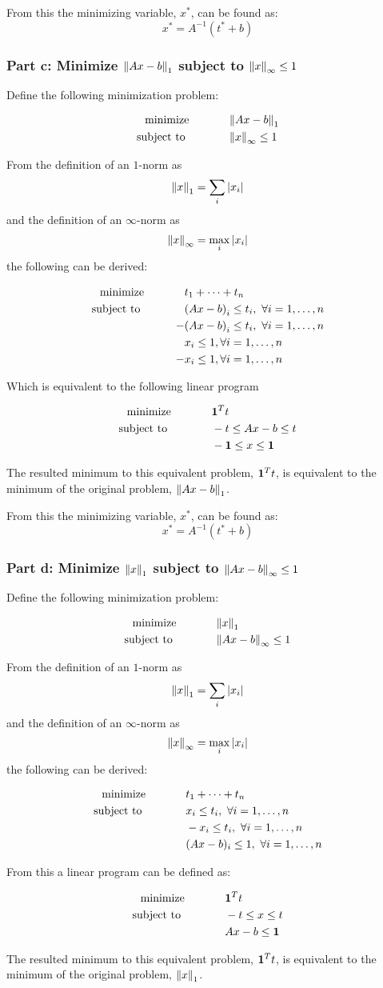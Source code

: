 \documentclass[letter]{article}
\newcommand{\optpblm}[3][eq:default]{
	\begin{equation}\label{#1}
		\begin{aligned}
			\text{minimize} \hspace{0.5in} &#2\vspace{5pt}\\
			\text{subject to \hspace{0.5in}} &#3
		\end{aligned}	
	\end{equation}
}
\begin{document}
From this the minimizing variable, $x^*$, can be found as: $$x^* = A^{-1} (t^* + b)$$

\newpage
\subsubsection{Part c: Minimize $\norm{Ax-b}_1$ subject to $\norm{x}_{\infty}\leq 1$}
Define the following minimization problem:
\optpblm{\norm{Ax-b}_1}{\norm{x}_\infty \leq 1}
From the definition of an $1$-norm as $$\norm{x}_1 = \sum_i \abs{x_i}$$ and the definition of an $\infty$-norm as $$\norm{x}_\infty = \max_i \abs{x_i}$$ the following can be derived:
\optpblm{t_1 + \cdots + t_n}{\qty(Ax - b)_i\leq t_i, \ \forall i = 1,\dots,n\\
	-& \qty(Ax - b)_i\leq t_i, \ \forall i = 1,\dots,n\\
	 & x_i \leq 1, \forall i = 1,\dots,n\\
	-& x_i \leq 1, \forall i = 1,\dots,n}
Which is equivalent to the following linear program
\optpblm{\vb{1}^T t}{-t \leq Ax - b \leq t\\
					&-\vb{1} \leq x \leq \vb{1}}

The resulted minimum to this equivalent problem, $\vb{1}^T t$, is equivalent to the minimum of the original problem, $\norm{Ax-b}_1$.

From this the minimizing variable, $x^*$, can be found as: $$x^* = A^{-1} (t^* + b)$$

\newpage
\subsubsection{Part d: Minimize $\norm{x}_1$ subject to $\norm{Ax-b}_\infty \leq 1$}
Define the following minimization problem:
\optpblm{\norm{x}_1}{\norm{Ax-b}_\infty \leq 1}
From the definition of an $1$-norm as $$\norm{x}_1 = \sum_i \abs{x_i}$$ and the definition of an $\infty$-norm as $$\norm{x}_\infty = \max_i \abs{x_i}$$ the following can be derived:
\optpblm{t_1 + \cdots + t_n}{x_i \leq t_i, \ \forall i = 1,\dots,n\\
							&-x_i \leq t_i, \ \forall i = 1,\dots,n\\
							&(Ax-b)_i \leq 1, \ \forall i = 1,\dots,n}
From this a linear program can be defined as:
\optpblm{\vb{1}^T t}{-t \leq x \leq t\\
			 		&Ax - b \leq \vb{1}}

The resulted minimum to this equivalent problem, $\vb{1}^T t$, is equivalent to the minimum of the original problem, $\norm{x}_1$.
\end{document}
